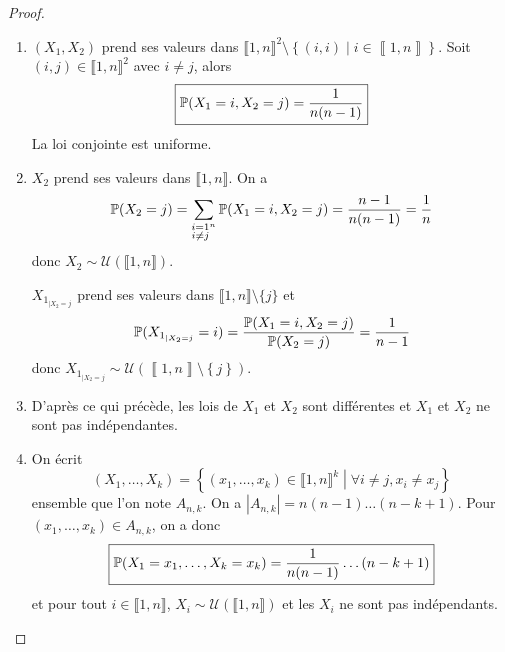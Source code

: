 \documentclass[12pt]{article}
\begin{document}
\begin{proof}
    \phantom{}
    \begin{enumerate}
        \item $(X_{1},X_{2})$ prend ses valeurs dans $\llbracket1,n\rrbracket^{2}\setminus\left\lbrace(i,i)\middle| i\in\left\llbracket1,n\right\rrbracket\right\rbrace$. Soit $(i,j)\in\llbracket1,n\rrbracket^{2}$ avec $i\neq j$, alors 
        \begin{equation}
            \boxed{\P(X_{1}=i,X_{2}=j)=\frac{1}{n(n-1)}}
        \end{equation}
        La loi conjointe est uniforme.

        \item $X_{2}$ prend ses valeurs dans $\llbracket1,n\rrbracket$. On a 
        \begin{equation}
            \P(X_{2}=j)=\sum_{\substack{i=1\\i\neq j}^{n}}\P(X_{1}=i,X_{2}=j)=\frac{n-1}{n(n-1)}=\frac{1}{n}
        \end{equation}
        donc $X_{2}\sim\mathcal{U}\left(\llbracket1,n\rrbracket\right)$.

        $X_{1_{\mid X_{2}=j}}$ prend ses valeurs dans $\llbracket1,n\rrbracket\setminus\lbrace j\rbrace$ et 
        \begin{equation}
            \P(X_{1_{\mid X_{2}=j}}=i)=\frac{\P(X_{1}=i,X_{2}=j)}{\P(X_{2}=j)}=\frac{1}{n-1}
        \end{equation}
        donc $X_{1_{\mid X_{2}=j}}\sim\mathcal{U}\left(\left\llbracket1,n\right\rrbracket\setminus\left\lbrace j\right\rbrace\right)$.

        \item D'après ce qui précède, les lois de $X_{1}$ et $X_{2}$ sont différentes et $X_{1}$ et $X_{2}$ ne sont pas indépendantes.
        
        \item On écrit 
        \begin{equation}
            (X_{1},\dots,X_{k})=\left\lbrace(x_{1},\dots,x_{k})\in\llbracket1,n\rrbracket^{k}\middle| \forall i\neq j,x_{i}\neq x_{j}\right\rbrace
        \end{equation}
        ensemble que l'on note $A_{n,k}$. On a $\left\lvert A_{n,k}\right\rvert=n(n-1)\dots(n-k+1)$. Pour $(x_{1},\dots,x_{k})\in A_{n,k}$, on a donc 
        \begin{equation}
            \boxed{\P(X_{1}=x_{1},\dots,X_{k}=x_{k})=\frac{1}{n(n-1)}\dots(n-k+1)}
        \end{equation}
        et pour tout $i\in\llbracket1,n\rrbracket$, $X_{i}\sim\mathcal{U}(\llbracket1,n\rrbracket)$ et les $X_{i}$ ne sont pas indépendants.


\end{enumerate}
\end{proof}
\end{document}
